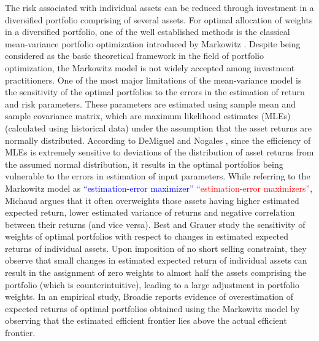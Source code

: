 \documentclass[12pt]{article}
\numberwithin{equation}{section}
\begin{document}
The risk associated with individual assets can be reduced through investment in a diversified portfolio comprising of several assets. For optimal allocation of weights in a diversified portfolio, one of the well established methods is the classical mean-variance portfolio optimization introduced by Markowitz \cite{Markowitz52,Markowitz59}. Despite being considered as the basic theoretical framework in the field of portfolio optimization, the Markowitz model is not widely accepted among investment practitioners. One of the most major limitations of the mean-variance model is the sensitivity of the optimal portfolios to the errors in the estimation of return and risk parameters. These parameters are estimated using sample mean and sample covariance matrix, which are maximum likelihood estimates (MLEs) (calculated using historical data) under the assumption that the asset returns are normally distributed. According to DeMiguel and Nogales \cite{DeMiguel09}, since the efficiency of MLEs is extremely sensitive to deviations of the distribution of asset returns from the assumed normal distribution, it results in the optimal portfolios being vulnerable to the errors in estimation of input parameters. While referring to the Markowitz model as \textcolor{blue}{``estimation-error maximizer''} \textcolor{red}{``estimation-error maximizers''}, Michaud \cite{Michaud89} argues that it often overweights those assets having higher estimated expected return, lower estimated variance of returns and negative correlation between their returns (and vice versa). Best and Grauer \cite{Best91} study the sensitivity of weights of optimal portfolios with respect to changes in estimated expected returns of individual assets. Upon imposition of no short selling constraint, they observe that small changes in estimated expected return of individual assets can result in the assignment of zero weights to almost half the assets comprising the portfolio (which is counterintuitive), leading to a large adjustment in portfolio weights. In an empirical study, Broadie \cite{Broadie93} reports evidence of overestimation of expected returns of optimal portfolios obtained using the Markowitz model by observing that the estimated efficient frontier lies above the actual efficient frontier.
\end{document}
